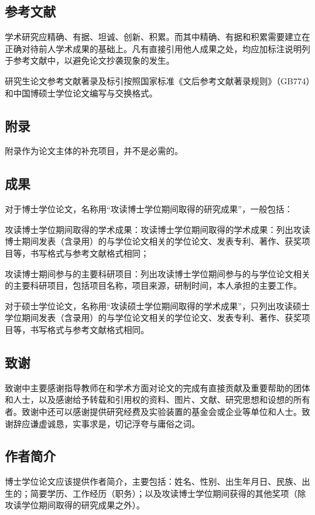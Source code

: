 \subsection{参考文献}

学术研究应精确、有据、坦诚、创新、积累。而其中精确、有据和积累需要建立在正确对待前人学术成果的基础上。凡有直接引用他人成果之处，均应加标注说明列于参考文献中，以避免论文抄袭现象的发生。

研究生论文参考文献著录及标引按照国家标准《文后参考文献著录规则》（GB774）和中国博硕士学位论文编写与交换格式。

\subsection{附录}

附录作为论文主体的补充项目，并不是必需的。

\subsection{成果}

对于博士学位论文，名称用“攻读博士学位期间取得的研究成果”，一般包括：

攻读博士学位期间取得的学术成果：攻读博士学位期间取得的学术成果：列出攻读博士期间发表（含录用）的与学位论文相关的学位论文、发表专利、著作、获奖项目等，书写格式与参考文献格式相同；

攻读博士期间参与的主要科研项目：列出攻读博士学位期间参与的与学位论文相关的主要科研项目，包括项目名称，项目来源，研制时间，本人承担的主要工作。

对于硕士学位论文，名称用“攻读硕士学位期间取得的学术成果”，只列出攻读硕士学位期间发表（含录用）的与学位论文相关的学位论文、发表专利、著作、获奖项目等，书写格式与参考文献格式相同。

\subsection{致谢}
致谢中主要感谢指导教师在和学术方面对论文的完成有直接贡献及重要帮助的团体和人士，以及感谢给予转载和引用权的资料、图片、文献、研究思想和设想的所有者。致谢中还可以感谢提供研究经费及实验装置的基金会或企业等单位和人士。致谢辞应谦虚诚恳，实事求是，切记浮夸与庸俗之词。

\subsection{作者简介}

博士学位论文应该提供作者简介，主要包括：姓名、性别、出生年月日、民族、出生的；简要学历、工作经历（职务）；以及攻读博士学位期间获得的其他奖项（除攻读学位期间取得的研究成果之外）。
